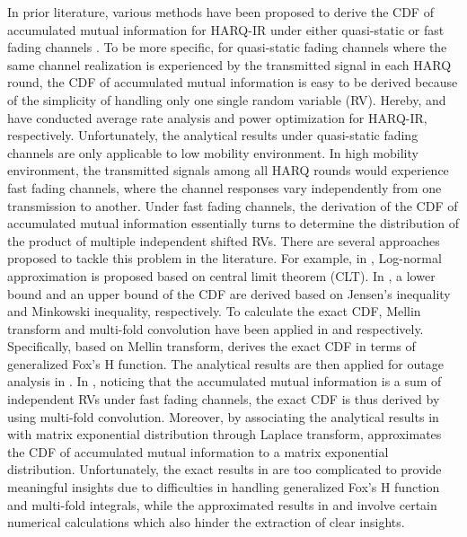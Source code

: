 \documentclass[12pt,onecolumn,draftcls]{IEEEtran}
\begin{document}
In prior literature, various methods have been proposed to derive the CDF of accumulated mutual information for HARQ-IR under either quasi-static \cite{shen2009average,makki2013green} or fast fading channels \cite{to2015power,kim2014optimal,sesia2004incremental,jinho2013energy,stanojev2009energy,
aghajanzadeh2011outage,yilmaz2010outage,chelli2013performance,
larsson2014throughput,larsson2016throughput}. To be more specific, for quasi-static fading channels where the same channel realization is experienced by the transmitted signal in each HARQ round, the CDF of accumulated mutual information is easy to be derived because of the simplicity of handling only one single random variable (RV). Hereby, \cite{shen2009average} and \cite{makki2013green} have conducted average rate analysis and power optimization for HARQ-IR, respectively. Unfortunately, the analytical results under quasi-static fading channels are only applicable to low mobility environment. In high mobility environment, the transmitted signals among all HARQ rounds would experience fast fading channels, where the channel responses vary independently from one transmission to another. Under fast fading channels, the derivation of the CDF of accumulated mutual information essentially turns to determine the distribution of the product of multiple independent shifted RVs. There are several approaches proposed to tackle this problem in the literature. For example, in \cite{to2015power,kim2014optimal,sesia2004incremental}, Log-normal approximation is proposed based on central limit theorem (CLT). In \cite{jinho2013energy,stanojev2009energy,aghajanzadeh2011outage}, a lower bound and an upper bound of the CDF are derived based on Jensen's inequality and Minkowski inequality, respectively. To calculate the exact CDF, Mellin transform and multi-fold convolution have been applied in \cite{yilmaz2010outage,chelli2013performance} and \cite{larsson2014throughput} respectively. Specifically, based on Mellin transform,
\cite{yilmaz2010outage} derives the exact CDF in terms of generalized Fox's H function. The analytical results are then applied for outage analysis in \cite{chelli2013performance}. In \cite{larsson2014throughput}, noticing that the accumulated mutual information is a sum of independent RVs under fast fading channels, the exact CDF is thus derived by using multi-fold convolution. Moreover, by associating the analytical results in \cite{larsson2014throughput} with matrix exponential distribution through Laplace transform, \cite{larsson2016throughput} approximates the CDF of accumulated mutual information to a matrix exponential distribution. Unfortunately, the exact results in \cite{yilmaz2010outage,chelli2013performance,larsson2014throughput}
are too complicated to provide meaningful insights due to difficulties in handling generalized Fox's H function and multi-fold integrals, while the approximated results in \cite{to2015power,kim2014optimal,sesia2004incremental} and \cite{larsson2016throughput} involve certain numerical calculations which also hinder the extraction of clear insights.
\end{document}
